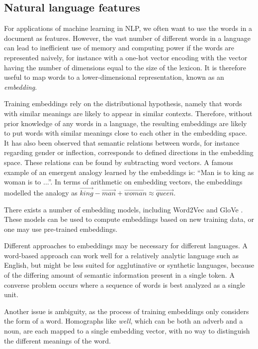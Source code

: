 \subsection{Natural language features}

For applications of machine learning in \ac{NLP}, we often want to use the
words in a document as features. However, the vast number of different words
in a language can lead to inefficient use of memory and computing power if
the words are represented naively, for instance with a one-hot vector
encoding with the vector having the number of dimensions equal to the size of
the lexicon. It is therefore useful to map words to a lower-dimensional
representation, known as an \emph{embedding}.

\sloppy Training embeddings rely on the distributional hypothesis, namely
that words with similar meanings are likely to appear in similar contexts.
Therefore, without prior knowledge of any words in a language, the resulting
embeddings are likely to put words with similar meanings close to each other
in the embedding space. It has also been observed that semantic relations
between words, for instance regarding gender or inflection, corresponds to
defined directions in the embedding space\autocite{mikolov2013linguistic}.
These relations can be found by subtracting word vectors. A famous example of
an emergent analogy learned by the embeddings is: ``Man is to king as woman
is to ...''. In terms of arithmetic on embedding vectors, the embeddings
modelled the analogy as $\vec{king}-\vec{man}+\vec{woman}\approx\vec{queen}$.
\fussy

There exists a number of embedding models, including Word2Vec
\autocite{mikolov2013word2vec} and GloVe \autocite{pennington2014glove}.
These models can be used to compute embeddings based on new training data, or
one may use pre-trained embeddings.

Different approaches to embeddings may be necessary for different languages.
A word-based approach can work well for a relatively analytic language such
as English, but might be less suited for agglutinative or synthetic
languages, because of the differing amount of semantic information present in
a single token. A converse problem occurs where a sequence of words is best
analyzed as a single unit.

Another issue is ambiguity, as the process of training embeddings only
considers the form of a word. Homographs like \emph{well}, which can be both
an adverb and a noun, are each mapped to a single embedding vector, with no
way to distinguish the different meanings of the word.


